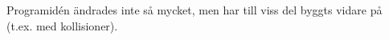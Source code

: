 Programidén ändrades inte så mycket,
men har till viss del byggts vidare på (t.ex. med kollisioner).

